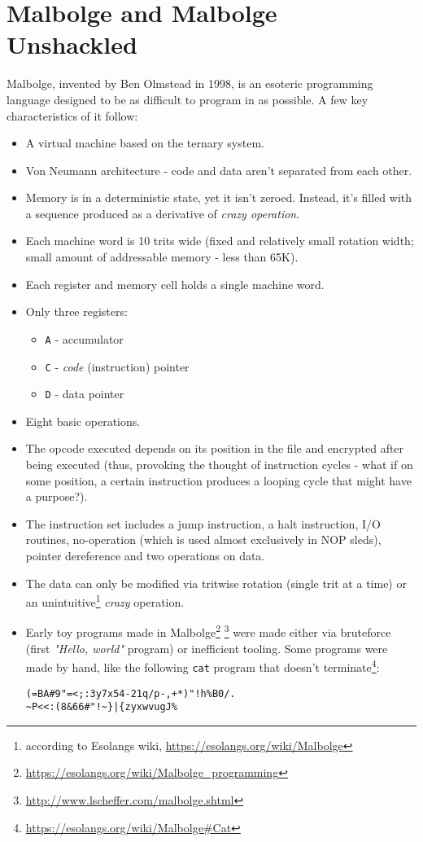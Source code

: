 
\chapter{Malbolge and Malbolge Unshackled}

\par Malbolge, invented by Ben Olmstead in 1998, is an esoteric programming language designed to be as difficult to program in as possible. A few key characteristics of it follow:

\begin{itemize}
    \item A virtual machine based on the ternary system.
    \item Von Neumann architecture - code and data aren't separated from each other.
    \item Memory is in a deterministic state, yet it isn't zeroed. Instead, it's filled with a sequence produced as a derivative of \textit{crazy operation}.
    \item Each machine word is 10 trits wide (fixed and relatively small rotation width; small amount of addressable memory - less than 65K).
    \item Each register and memory cell holds a single machine word.
    \item Only three registers: \begin{itemize}
        \item \verb|A| - accumulator
        \item \verb|C| - \textit{code} (instruction) pointer
        \item \verb|D| - data pointer
    \end{itemize}
    \item Eight basic operations.
    \item The opcode executed depends on its position in the file and encrypted after being executed (thus, provoking the thought of instruction cycles - what if on some position, a certain instruction produces a looping cycle that might have a purpose?).
    \item The instruction set includes a jump instruction, a halt instruction, I/O routines, no-operation (which is used almost exclusively in NOP sleds), pointer dereference and two operations on data.
    \item The data can only be modified via tritwise rotation (single trit at a time) or an unintuitive\footnote{according to Esolangs wiki, \url{https://esolangs.org/wiki/Malbolge}} \textit{crazy} operation.
    \item Early toy programs made in Malbolge\footnote{\url{https://esolangs.org/wiki/Malbolge_programming}} \footnote{\url{http://www.lscheffer.com/malbolge.shtml}} were made either via bruteforce (first \textit{"Hello, world"} program) or inefficient tooling. Some programs were made by hand, like the following \verb|cat| program that doesn't terminate\footnote{\url{https://esolangs.org/wiki/Malbolge#Cat}}:
    \begin{verbatim}
(=BA#9"=<;:3y7x54-21q/p-,+*)"!h%B0/.
~P<<:(8&66#"!~}|{zyxwvugJ%
    \end{verbatim}
\end{itemize}

